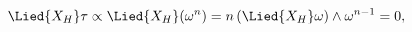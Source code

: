 \begin{equation}
  \Lied{X_{\mathnormal{H}}}\tau \propto
  \Lied{X_{\mathnormal{H}}}(\omega^n)
  = n\,(\Lied{X_{\mathnormal{H}}}\omega)\wedge\omega^{n-1}=0,
\end{equation}

